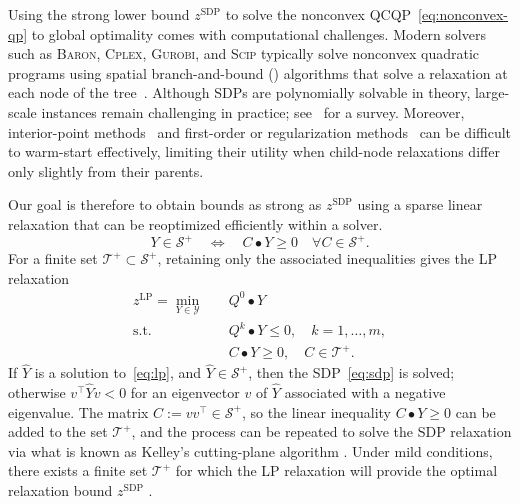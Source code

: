 \documentclass[twoside]{article}
\newcommand{\oo}[1]{{\textcolor{blue}{#1}}}
\newcommand{\ooc}[1]{{ \oo{[OG comment: #1}]}}
\newcommand{\jim}[1]{{ \oo{[Jim comment: #1}]}}
\newcommand{\matip}[2]{#1 \bullet #2}
\newcommand{\citep}[1]{\cite{#1}}
\newcommand{\citet}[1]{\cite{#1}}
\begin{document}
	Using the strong lower bound $z^{\mathrm{SDP}}$ to solve the nonconvex QCQP~\eqref{eq:nonconvex-qp} to global optimality comes with computational challenges. Modern solvers such as \textsc{Baron}, \textsc{Cplex}, \textsc{Gurobi}, and \textsc{Scip} typically solve nonconvex quadratic programs using spatial branch-and-bound (\BnBx) algorithms that solve a relaxation at each node of the \BnB tree~\citep{tawarmalani.sahinidis:05,bonami.gunluk.linderoth:18,bestuzheva.et.al:25}.  Although SDPs are polynomially solvable in theory, large-scale instances remain challenging in practice; see~\citet{majumdar.et.al:20} for a survey. Moreover, interior-point methods~\citep{nesterov.nemirovski:94} and first-order or regularization methods~\citep{malick.et.al:09,sun.et.al:19} can be difficult to warm-start effectively, limiting their utility when child-node relaxations differ only slightly from their parents.
	
	Our goal is therefore to obtain bounds as strong as $z^{\mathrm{SDP}}$ using a sparse linear relaxation that can be reoptimized efficiently within a \BnB solver. 
	\begin{equation}
		\label{eq:semi-infinite-psd}
		Y \in \mathcal S^+ \quad \Longleftrightarrow \quad \matip{C}{Y} \geq 0 \quad \forall C \in \mathcal S^+.
	\end{equation}
	For a finite set $\mathcal T^+\subset\mathcal S^+$, retaining only the associated inequalities gives the LP relaxation
	\begin{subequations}
		\label{eq:lp}
		\begin{align}
			z^{\mathrm{LP}} = \min_{Y \in \mathcal Y} \quad & \matip{Q^0}{Y}\\
			\text{s.t.}\quad & \matip{Q^k}{Y} \leq 0, \quad k=1,\ldots,m,\\
			& \matip{C}{Y} \geq 0, \quad C \in \mathcal T^+.
		\end{align}
	\end{subequations}
	If $\widehat{Y}$ is a solution to~\eqref{eq:lp}, and $\widehat{Y} \in \mathcal{S}^+$, then the SDP~\eqref{eq:sdp} is solved; otherwise $v^\top \widehat{Y} v < 0$ for an eigenvector $v$ of $\widehat{Y}$ associated with a negative eigenvalue.  The matrix $C := vv^\top \in \mathcal{S}^+$, so the linear inequality $C \bullet Y \geq 0$ can be added to the set $\mathcal{T}^+$, and the process can be repeated to solve the SDP relaxation via what is known as Kelley's cutting-plane algorithm \cite{kelley:60}.  Under mild conditions, there exists a finite set $\mathcal{T}^+$ for which the LP relaxation will provide the optimal relaxation bound $z^{\mathrm{SDP}}$ \cite{krishnan.mitchell:06,deroux.carr.ravi:25}.
	
\end{document}
